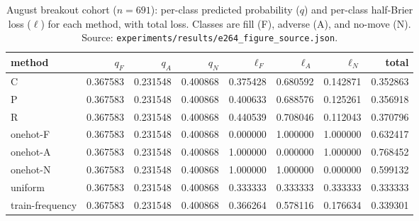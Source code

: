 \begin{table}[h]\centering
\caption{August breakout cohort ($n=691$): per-class predicted probability ($q$) and per-class
half-Brier loss ($\ell$) for each method, with total loss. Classes are fill (F), adverse (A),
and no-move (N). Source: \texttt{experiments/results/e264\_figure\_source.json}.}
\label{tab:augclass}
\begin{tabular}{lrrrrrrr}
\toprule
method & $q_F$ & $q_A$ & $q_N$ & $\ell_F$ & $\ell_A$ & $\ell_N$ & total \\
\midrule
C & 0.367583 & 0.231548 & 0.400868 & 0.375428 & 0.680592 & 0.142871 & 0.352863 \\
P & 0.367583 & 0.231548 & 0.400868 & 0.400633 & 0.688576 & 0.125261 & 0.356918 \\
R & 0.367583 & 0.231548 & 0.400868 & 0.440539 & 0.708046 & 0.112043 & 0.370796 \\
onehot-F & 0.367583 & 0.231548 & 0.400868 & 0.000000 & 1.000000 & 1.000000 & 0.632417 \\
onehot-A & 0.367583 & 0.231548 & 0.400868 & 1.000000 & 0.000000 & 1.000000 & 0.768452 \\
onehot-N & 0.367583 & 0.231548 & 0.400868 & 1.000000 & 1.000000 & 0.000000 & 0.599132 \\
uniform & 0.367583 & 0.231548 & 0.400868 & 0.333333 & 0.333333 & 0.333333 & 0.333333 \\
train-frequency & 0.367583 & 0.231548 & 0.400868 & 0.366264 & 0.578116 & 0.176634 & 0.339301 \\
\bottomrule
\end{tabular}\end{table}
